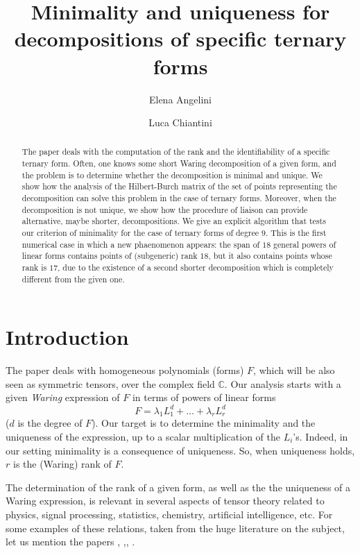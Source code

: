 \documentclass{amsart}
\author[E.~Angelini]{Elena Angelini}
\author[L.~Chiantini]{Luca Chiantini}
\newcommand{\C}{\mathbb{C}}
\theoremstyle{definition}
\begin{document}
\title[Minimality and uniqueness for decompositions ]
{Minimality and uniqueness for decompositions of   specific ternary forms}
\date{}

\begin{abstract}
The paper deals with the computation of the rank and the identifiability of a specific ternary form. Often, one knows some short Waring decomposition of a given form, and the problem is to determine whether the decomposition is minimal and unique. We show how the analysis of the Hilbert-Burch matrix of 
the set of points representing the decomposition can solve this problem in the case of ternary forms. Moreover, when the decomposition
is not unique, we show how the procedure of liaison can provide alternative, maybe shorter, decompositions. We give an explicit 
algorithm that tests our criterion of minimality for the case of ternary forms of degree $9$. This is the first numerical case in which 
a new phaenomenon appears: the span of $18$ general powers of linear forms contains points of (subgeneric) rank $18$,  
but it also contains points whose rank is $17$, due to the existence of a second shorter decomposition which is completely different from the given one. 

\end{abstract}

\maketitle

\section{Introduction}

The paper deals with homogeneous polynomials (forms) $F$, which will be also seen as symmetric tensors, over the complex field $\C$.
Our analysis starts with a given {\it Waring }  expression of $F$ in terms of powers of linear forms 
$$ F= \lambda_1L_1^d+\dots +\lambda_rL_r^d$$
($d$ is the degree of $F$). Our target is to determine the minimality and the uniqueness of the expression, up to a scalar multiplication of the $L_i$'s. 
Indeed,  in our setting minimality is a consequence of uniqueness. So, when uniqueness holds, $r$ is the (Waring) rank of $F$.

The determination of the rank of a given form, as well as the the uniqueness of a Waring expression, 
is relevant in several aspects of tensor theory related to physics, signal processing, statistics, chemistry, artificial intelligence, etc.
For some examples of these relations, taken from the huge literature on the subject, let us mention the papers  \cite{AllmanMatiasRhodes09}, \cite{AnandkumarGeHsuKakadeTelgarsky14},\cite{AppellofDavidson81}, \cite{RaoLiZhang18}.
\end{document}
